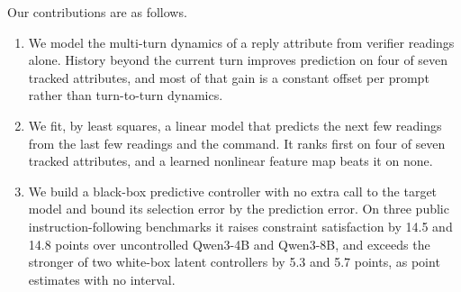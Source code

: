 Our contributions are as follows.
\begin{enumerate}
  \item We model the multi-turn dynamics of a reply attribute from verifier readings alone. History beyond the current turn improves prediction on four of seven tracked attributes, and most of that gain is a constant offset per prompt rather than turn-to-turn dynamics.  %
  \item We fit, by least squares, a linear model that predicts the next few readings from the last few readings and the command. It ranks first on four of seven tracked attributes, and a learned nonlinear feature map beats it on none.  %
  \item We build a black-box predictive controller with no extra call to the target model and bound its selection error by the prediction error. On three public instruction-following benchmarks it raises constraint satisfaction by 14.5 and 14.8 points over uncontrolled Qwen3-4B and Qwen3-8B, and exceeds the stronger of two white-box latent controllers by 5.3 and 5.7 points, as point estimates with no interval.  %
\end{enumerate}
